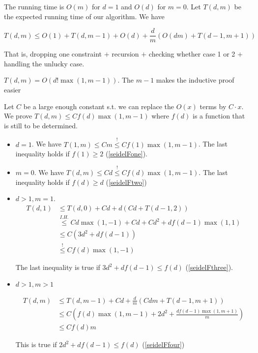 The running time is $O(m)$ for $d=1$ and $O(d)$ for $m=0$. Let $T(d,m)$ be the expected running time of our algorithm. We have

\[T(d,m) \leq O(1) + T(d,m-1) + O(d) + \frac dm \left(O(dm) + T(d-1,m+1)\right)\]

That is, dropping one constraint $+$ recursion $+$ checking whether case 1 or 2 $+$ handling the unlucky case.

\begin{thm} $T(d,m)=O(d!\max (1,m-1))$. The $m-1$ makes the inductive proof easier
\end{thm}

\begin{pr} Let $C$ be a large enough constant s.t. we can replace the $O(x)$ terms by $C\cdot x$. We prove $T(d,m)\leq C f(d)\max (1,m-1)$ where $f(d)$ is a function that is still to be determined.

\begin{itemize}
\item $d=1$. We have $T(1,m) \leq Cm \stackrel{!}{\leq} Cf(1)\max(1,m-1)$. The last inequality holds if $f(1)\geq 2$ (\ref{seidelFone}). 
\item $m=0$. We have $T(d,m)\leq Cd \stackrel{!}{\leq} Cf(d) \max (1,m-1)$. The last inequality holds if $f(d)\geq d$ (\ref{seidelFtwo})
\item $d>1,m=1$. 
\begin{align*}
T(d,1) &\leq T(d,0)+Cd+d(Cd+T(d-1,2))\\
	&\stackrel{I.H.}{\leq} Cd\max(1,-1)+Cd +Cd^2 + df(d-1)\max(1,1) \\
	&\leq C(3d^2+df(d-1))\\
	&\stackrel{!}{\leq} Cf(d) \max(1,-1)\end{align*}

The last inequality is true if $3d^2+df(d-1) \leq f(d)$ (\ref{seidelFthree}).

\item $d>1,m>1$

\begin{align*}
T(d,m) & \leq T(d,m-1) + Cd+ \frac dm \left( C dm + T (d-1,m+1)\right)\\
	&\leq C\left(f(d)\max(1,m-1)+2d^2+\frac{df(d-1) \max(1,m+1)}{m}\right)\\
	&\leq Cf(d) m
\end{align*}

This is true if $2d^2+df(d-1) \leq f(d)$ (\ref{seidelFfour})
\end{itemize}



\end{pr}
